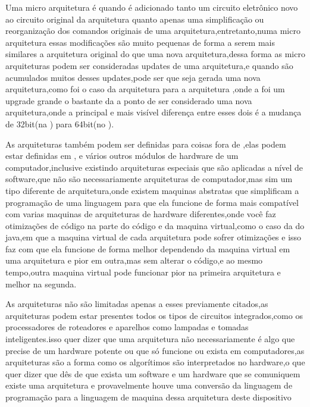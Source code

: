 \documentclass[
	12pt,				%
	openright,			%
	oneside,			%
	a4paper,			%
	english,			%
	french,				%
	spanish,			%
	brazil,				%
	]{abntex2}
\begin{document}
Uma micro arquitetura é quando é adicionado tanto um circuito eletrônico novo ao circuito original da arquitetura quanto apenas uma simplificação ou reorganização dos comandos originais de uma arquitetura,entretanto,numa micro arquitetura essas modificações são muito pequenas de forma a serem mais similares a arquitetura original do que uma nova arquitetura,dessa forma as micro arquiteturas podem ser consideradas updates de uma arquitetura,e quando são acumulados muitos desses updates,pode ser que seja gerada uma nova arquitetura,como foi o caso da arquitetura  para a arquitetura ,onde a  foi um upgrade grande o bastante da  a ponto de ser considerado uma nova arquitetura,onde a principal e mais visível diferença entre esses dois é a mudança de 32bit(na ) para 64bit(no ).\newline

As arquiteturas também podem ser definidas para coisas fora de ,elas podem estar definidas em , e vários outros módulos de hardware de um computador,inclusive existindo arquiteturas especiais que são aplicadas a nível de software,que não são necessariamente arquiteturas de computador,mas sim um tipo diferente de arquitetura,onde existem maquinas abstratas que simplificam a programação de uma linguagem para que ela funcione de forma mais compatível com varias maquinas de arquiteturas de hardware diferentes,onde você faz otimizações de código na parte do código e da maquina virtual,como o caso da  do java,em que a maquina virtual de cada arquitetura pode sofrer otimizações e isso faz com que ela funcione de forma melhor dependendo da maquina virtual em uma arquitetura e pior em outra,mas sem alterar o código,e ao mesmo tempo,outra maquina virtual pode funcionar pior na primeira arquitetura e melhor na segunda.\newline

As arquiteturas não são limitadas apenas a esses previamente citados,as arquiteturas podem estar presentes todos os tipos de circuitos integrados,como os processadores de roteadores e aparelhos  como lampadas e tomadas inteligentes.isso quer dizer que uma arquitetura não necessariamente é algo que precise de um hardware potente ou que só funcione ou exista em computadores,as arquiteturas são a forma como os algorítimos são interpretados no hardware,o que quer dizer que dês de que exista um software e um hardware que se comuniquem existe uma arquitetura e provavelmente houve uma conversão da linguagem de programação para a linguagem de maquina dessa arquitetura deste dispositivo\newline
\end{document}
